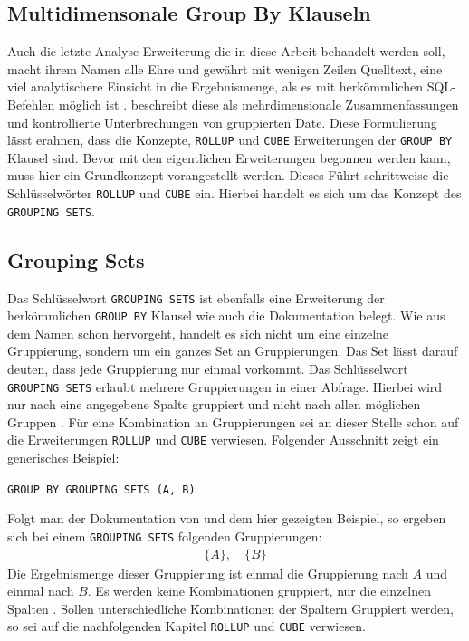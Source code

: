\begin{samepage}
	\section{Multidimensonale Group By Klauseln}
	\label{sec:rollup_and_cube} Auch die letzte Analyse-Erweiterung die in diese Arbeit
	behandelt werden soll, macht ihrem Namen alle Ehre und gewährt mit wenigen
	Zeilen Quelltext, eine viel analytischere Einsicht in die Ergebnismenge, als
	es mit herkömmlichen SQL-Befehlen möglich ist \citep[vgl.][S. 303]{melton2002advanced}.
	\citet[S. 303]{melton2002advanced} beschreibt diese als mehrdimensionale Zusammenfassungen
	und kontrollierte Unterbrechungen von gruppierten Date. Diese Formulierung
	lässt erahnen, dass die Konzepte, \texttt{ROLLUP} und \texttt{CUBE}
	Erweiterungen der \texttt{GROUP BY} Klausel sind. Bevor mit den eigentlichen
	Erweiterungen begonnen werden kann, muss hier ein Grundkonzept vorangestellt werden.
	Dieses Führt schrittweise die Schlüsselwörter \texttt{ROLLUP} und \texttt{CUBE}
	ein. Hierbei handelt es sich um das Konzept des \texttt{GROUPING SETS}.

	\subsection{Grouping Sets}
	\label{subsec:grouping_sets} Das Schlüsselwort \texttt{GROUPING SETS} ist ebenfalls
	eine Erweiterung der herkömmlichen \texttt{GROUP BY} Klausel wie auch die
	\citet{oracle16} Dokumentation belegt. Wie aus dem Namen schon hervorgeht, handelt
	es sich nicht um eine einzelne Gruppierung, sondern um ein ganzes Set an
	Gruppierungen. Das Set lässt darauf deuten, dass jede Gruppierung nur einmal
	vorkommt. Das Schlüsselwort \texttt{GROUPING SETS} erlaubt mehrere
	Gruppierungen in einer Abfrage. Hierbei wird nur nach eine angegebene Spalte gruppiert
	und nicht nach allen möglichen Gruppen \citep[vgl.][]{oracle16}. Für eine Kombination
	an Gruppierungen sei an dieser Stelle schon auf die Erweiterungen \texttt{ROLLUP}
	und \texttt{CUBE} verwiesen. Folgender Ausschnitt zeigt ein generisches
	Beispiel:
	\begin{center}
		\texttt{GROUP BY GROUPING SETS (A, B)}
	\end{center}
	Folgt man der Dokumentation von \citet{oracle16} und dem hier gezeigten
	Beispiel, so ergeben sich bei einem \texttt{GROUPING SETS} folgenden
	Gruppierungen:
	\begin{align*}
		\{A\}, \quad \{B\}
	\end{align*}
	Die Ergebnismenge dieser Gruppierung ist einmal die Gruppierung nach $A$ und einmal
	nach $B$. Es werden keine Kombinationen gruppiert, nur die einzelnen Spalten \citep[vgl.][]{oracle16}.
	Sollen unterschiedliche Kombinationen der Spaltern Gruppiert werden, so sei
	auf die nachfolgenden Kapitel \texttt{ROLLUP} und \texttt{CUBE} verwiesen.
\end{samepage}

